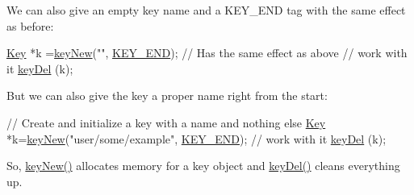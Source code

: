 We can also give an empty key name and a K\-E\-Y\-\_\-\-E\-N\-D tag with the same effect as before\-:


\begin{DoxyCodeInclude}
\hyperlink{classkdb_1_1Key_a5679f5cae63caddd64a60388b9cc77fa}{Key} *k =\hyperlink{group__key_gad23c65b44bf48d773759e1f9a4d43b89}{keyNew}(\textcolor{stringliteral}{""}, \hyperlink{group__key_gga91fb3178848bd682000958089abbaf40aa8adb6fcb92dec58fb19410eacfdd403}{KEY\_END}); \textcolor{comment}{// Has the same effect as above}
\textcolor{comment}{// work with it}
\hyperlink{group__key_ga3df95bbc2494e3e6703ece5639be5bb1}{keyDel} (k);
\end{DoxyCodeInclude}
 But we can also give the key a proper name right from the start\-:


\begin{DoxyCodeInclude}
\textcolor{comment}{// Create and initialize a key with a name and nothing else}
\hyperlink{classkdb_1_1Key_a5679f5cae63caddd64a60388b9cc77fa}{Key} *k=\hyperlink{group__key_gad23c65b44bf48d773759e1f9a4d43b89}{keyNew}(\textcolor{stringliteral}{"user/some/example"}, \hyperlink{group__key_gga91fb3178848bd682000958089abbaf40aa8adb6fcb92dec58fb19410eacfdd403}{KEY\_END});
\textcolor{comment}{// work with it}
\hyperlink{group__key_ga3df95bbc2494e3e6703ece5639be5bb1}{keyDel} (k);
\end{DoxyCodeInclude}
 So, \hyperlink{group__key_gad23c65b44bf48d773759e1f9a4d43b89}{key\-New()} allocates memory for a key object and \hyperlink{group__key_ga3df95bbc2494e3e6703ece5639be5bb1}{key\-Del()} cleans everything up.

